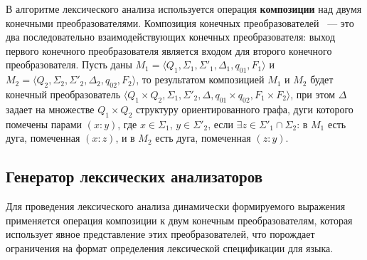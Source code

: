 \documentclass[10pt, conference, compsocconf]{IEEEtran}
\begin{document}
В алгоритме лексического анализа используется операция \textbf{композиции} над двумя конечными преобразователями. Композиция конечных преобразователей~\cite{FST} --- это два последовательно взаимодействующих конечных преобразователя: выход первого конечного преобразователя является входом для второго конечного преобразователя. Пусть даны $M_1 = \langle Q_1, \Sigma_1, \Sigma'_1, \Delta_1, q_{01}, F_1 \rangle$ и $M_2 = \langle Q_2, \Sigma_2, \Sigma'_2, \Delta_2, q_{02}, F_2 \rangle$, то результатом композицией $M_1$ и $M_2$ будет конечный преобразователь $\langle Q_1 \times Q_2, \Sigma_1, \Sigma'_2, \Delta, q_{01} \times q_{02}, F_1 \times F_2 \rangle$, при этом $\Delta$ задает на множестве $Q_1 \times Q_2$ структуру ориентированного графа, дуги которого помечены парами $(x : y)$, где $x \in \Sigma_1$, $y \in \Sigma'_2$, если $\exists z \in \Sigma'_1 \cap \Sigma_2$: в $M_1$ есть дуга, помеченная $(x : z)$, и в $M_2$ есть дуга, помеченная $(z : y)$.

\subsection{Генератор лексических анализаторов}
Для проведения лексического анализа динамически формируемого выражения применяется операция композиции к двум конечным преобразователям, которая использует явное представление этих преобразователей, что порождает ограничения на формат определения лексической спецификации для языка. 
\end{document}
